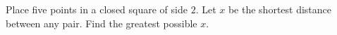 Place five points in a closed square of side $2$. Let $x$ be the shortest distance between any pair. Find the greatest possible $x$.
